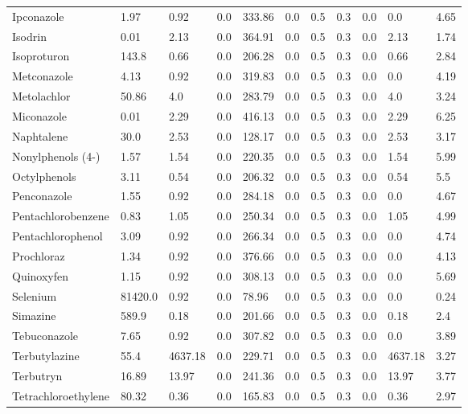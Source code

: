 \begin{tabular}{lllllllllll}
\cline{1-11}
Ipconazole & 1.97 & 0.92 & 0.0 & 333.86 & 0.0 & 0.5 & 0.3 & 0.0 & 0.0 & 4.65 \\
\cline{1-11}
Isodrin & 0.01 & 2.13 & 0.0 & 364.91 & 0.0 & 0.5 & 0.3 & 0.0 & 2.13 & 1.74 \\
\cline{1-11}
Isoproturon & 143.8 & 0.66 & 0.0 & 206.28 & 0.0 & 0.5 & 0.3 & 0.0 & 0.66 & 2.84 \\
\cline{1-11}
Metconazole & 4.13 & 0.92 & 0.0 & 319.83 & 0.0 & 0.5 & 0.3 & 0.0 & 0.0 & 4.19 \\
\cline{1-11}
Metolachlor & 50.86 & 4.0 & 0.0 & 283.79 & 0.0 & 0.5 & 0.3 & 0.0 & 4.0 & 3.24 \\
\cline{1-11}
Miconazole & 0.01 & 2.29 & 0.0 & 416.13 & 0.0 & 0.5 & 0.3 & 0.0 & 2.29 & 6.25 \\
\cline{1-11}
Naphtalene & 30.0 & 2.53 & 0.0 & 128.17 & 0.0 & 0.5 & 0.3 & 0.0 & 2.53 & 3.17 \\
\cline{1-11}
Nonylphenols (4-) & 1.57 & 1.54 & 0.0 & 220.35 & 0.0 & 0.5 & 0.3 & 0.0 & 1.54 & 5.99 \\
\cline{1-11}
Octylphenols & 3.11 & 0.54 & 0.0 & 206.32 & 0.0 & 0.5 & 0.3 & 0.0 & 0.54 & 5.5 \\
\cline{1-11}
Penconazole & 1.55 & 0.92 & 0.0 & 284.18 & 0.0 & 0.5 & 0.3 & 0.0 & 0.0 & 4.67 \\
\cline{1-11}
Pentachlorobenzene & 0.83 & 1.05 & 0.0 & 250.34 & 0.0 & 0.5 & 0.3 & 0.0 & 1.05 & 4.99 \\
\cline{1-11}
Pentachlorophenol & 3.09 & 0.92 & 0.0 & 266.34 & 0.0 & 0.5 & 0.3 & 0.0 & 0.0 & 4.74 \\
\cline{1-11}
Prochloraz & 1.34 & 0.92 & 0.0 & 376.66 & 0.0 & 0.5 & 0.3 & 0.0 & 0.0 & 4.13 \\
\cline{1-11}
Quinoxyfen & 1.15 & 0.92 & 0.0 & 308.13 & 0.0 & 0.5 & 0.3 & 0.0 & 0.0 & 5.69 \\
\cline{1-11}
Selenium & 81420.0 & 0.92 & 0.0 & 78.96 & 0.0 & 0.5 & 0.3 & 0.0 & 0.0 & 0.24 \\
\cline{1-11}
Simazine & 589.9 & 0.18 & 0.0 & 201.66 & 0.0 & 0.5 & 0.3 & 0.0 & 0.18 & 2.4 \\
\cline{1-11}
Tebuconazole & 7.65 & 0.92 & 0.0 & 307.82 & 0.0 & 0.5 & 0.3 & 0.0 & 0.0 & 3.89 \\
\cline{1-11}
Terbutylazine & 55.4 & 4637.18 & 0.0 & 229.71 & 0.0 & 0.5 & 0.3 & 0.0 & 4637.18 & 3.27 \\
\cline{1-11}
Terbutryn & 16.89 & 13.97 & 0.0 & 241.36 & 0.0 & 0.5 & 0.3 & 0.0 & 13.97 & 3.77 \\
\cline{1-11}
Tetrachloroethylene & 80.32 & 0.36 & 0.0 & 165.83 & 0.0 & 0.5 & 0.3 & 0.0 & 0.36 & 2.97 \\

\end{tabular}
